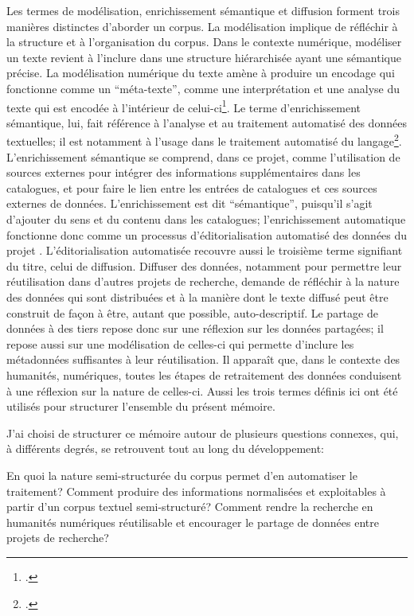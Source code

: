 Les termes de modélisation, enrichissement sémantique et diffusion forment trois manières distinctes d'aborder un corpus. La modélisation implique de réfléchir à la structure et à l'organisation du corpus. Dans le contexte numérique, modéliser un texte revient à l'inclure dans une structure hiérarchisée ayant une sémantique précise. La modélisation numérique du texte amène à produire un encodage qui fonctionne comme un \enquote{méta-texte}, comme une interprétation et une analyse du texte qui est encodée à l'intérieur de celui-ci\footcite[p. 27]{flanders_gentle_2019}. Le terme d'enrichissement sémantique, lui, fait référence à l'analyse et au traitement automatisé des données textuelles; il est notamment à l'usage dans le traitement automatisé du langage\footcite{brando_evaluation_2016}. L'enrichissement sémantique se comprend, dans ce projet, comme l'utilisation de sources externes pour intégrer des informations supplémentaires dans les catalogues, et pour faire le lien entre les entrées de catalogues et ces sources externes de données. L'enrichissement est dit \enquote{sémantique}, puisqu'il s'agit d'ajouter du sens et du contenu dans les catalogues; l'enrichissement automatique fonctionne donc comme un processus d'éditorialisation automatisé des données du projet \mssktb{}. L'éditorialisation automatisée recouvre aussi le troisième terme signifiant du titre, celui de diffusion. Diffuser des données, notamment pour permettre leur réutilisation dans d'autres projets de recherche, demande de réfléchir à la nature des données qui sont distribuées et à la manière dont le texte diffusé peut être construit de façon à être, autant que possible, auto-descriptif. Le partage de données à des tiers repose donc sur une réflexion sur les données partagées; il repose aussi sur une modélisation de celles-ci qui permette d'inclure les métadonnées suffisantes à leur réutilisation. Il apparaît que, dans le contexte des humanités, numériques, toutes les étapes de retraitement des données conduisent à une réflexion sur la nature de celles-ci. Aussi les trois termes définis ici ont été utilisés pour structurer l'ensemble du présent mémoire.

J'ai choisi de structurer ce mémoire autour de plusieurs questions connexes, qui, à différents degrés, se retrouvent tout au long du développement:

\begin{adjustwidth}{60pt}{60pt}
	En quoi la nature semi-structurée du corpus permet d'en automatiser le traitement? Comment produire des informations normalisées et exploitables à partir d'un corpus textuel semi-structuré? Comment rendre la recherche en humanités numériques réutilisable et encourager le partage de données entre projets de recherche?
\end{adjustwidth}

